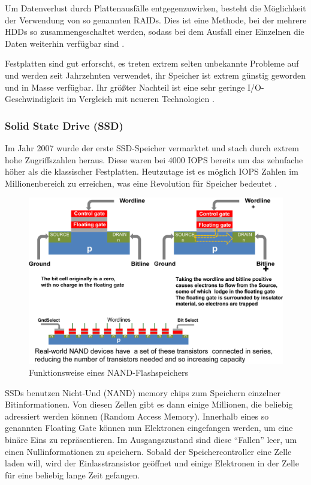 Um Datenverlust durch Plattenausfälle entgegenzuwirken, besteht die Möglichkeit der Verwendung von so genannten RAIDs. Dies ist eine Methode, bei der mehrere HDDs so zusammengeschaltet werden, sodass bei dem Ausfall einer Einzelnen die Daten weiterhin verfügbar sind \parencite{wikibooks.2016}.

Festplatten sind gut erforscht, es treten extrem selten unbekannte Probleme auf und werden seit Jahrzehnten verwendet, ihr Speicher ist extrem günstig geworden und in Masse verfügbar. Ihr größter Nachteil ist eine sehr geringe I/O-Geschwindigkeit im Vergleich mit neueren Technologien \parencite[Kap. 3]{kaufmann.2016}.

\subsubsection{Solid State Drive (SSD)}

Im Jahr 2007 wurde der erste \acs{SSD}-Speicher vermarktet und stach durch extrem hohe Zugriffszahlen heraus. Diese waren bei 4000 \gls{IOPS} bereits um das zehnfache höher als die klassischer Festplatten. Heutzutage ist es möglich IOPS Zahlen im Millionenbereich zu erreichen, was eine Revolution für Speicher bedeutet \parencite[Kap. 3]{kaufmann.2016}.

\begin{figure}[hbt]
	\centering
	\includegraphics[scale=0.85]{images/flash}
	\caption{Funktionsweise eines NAND-Flashspeichers \parencite{kaufmann.2016}}
	\label{fig:flash}
\end{figure}

\acsp{SSD} benutzen Nicht-Und (NAND) memory chips zum Speichern einzelner Bitinformationen. Von diesen Zellen gibt es dann einige Millionen, die beliebig adressiert werden können (Random Access Memory). Innerhalb eines so genannten Floating Gate können nun Elektronen eingefangen werden, um eine binäre Eins zu repräsentieren. Im Ausgangszustand sind diese ``Fallen'' leer, um einen Nullinformationen zu speichern. Sobald der Speichercontroller eine Zelle laden will, wird der Einlasstransistor geöffnet und einige Elektronen in der Zelle für eine beliebig lange Zeit gefangen.

